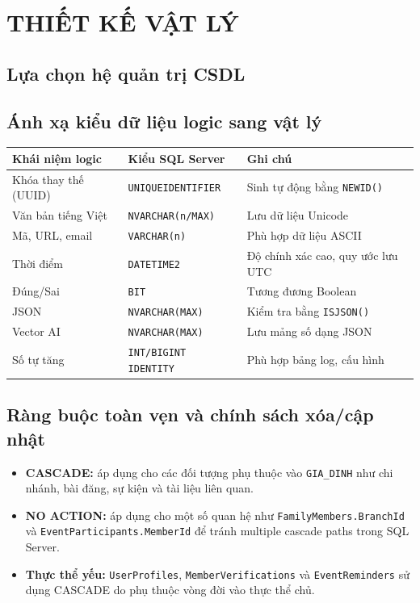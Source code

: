 \chapter{THIẾT KẾ VẬT LÝ}

\section{Lựa chọn hệ quản trị CSDL}

\section{Ánh xạ kiểu dữ liệu logic sang vật lý}

\begin{center}
\begin{tabularx}{\linewidth}{@{}l>{\raggedright\arraybackslash}l>{\raggedright\arraybackslash}X@{}}
\toprule
\textbf{Khái niệm logic} & \textbf{Kiểu SQL Server} & \textbf{Ghi chú} \\
\midrule
Khóa thay thế (UUID) & \texttt{UNIQUEIDENTIFIER} & Sinh tự động bằng \texttt{NEWID()} \\
Văn bản tiếng Việt & \texttt{NVARCHAR(n/MAX)} & Lưu dữ liệu Unicode \\
Mã, URL, email & \texttt{VARCHAR(n)} & Phù hợp dữ liệu ASCII \\
Thời điểm & \texttt{DATETIME2} & Độ chính xác cao, quy ước lưu UTC \\
Đúng/Sai & \texttt{BIT} & Tương đương Boolean \\
JSON & \texttt{NVARCHAR(MAX)} & Kiểm tra bằng \texttt{ISJSON()} \\
Vector AI & \texttt{NVARCHAR(MAX)} & Lưu mảng số dạng JSON \\
Số tự tăng & \texttt{INT/BIGINT IDENTITY} & Phù hợp bảng log, cấu hình \\
\bottomrule
\end{tabularx}
\end{center}

\section{Ràng buộc toàn vẹn và chính sách xóa/cập nhật}

\begin{itemize}
    \item \textbf{CASCADE:} áp dụng cho các đối tượng phụ thuộc vào \texttt{GIA\_DINH} như chi nhánh, bài đăng, sự kiện và tài liệu liên quan.
    \item \textbf{NO ACTION:} áp dụng cho một số quan hệ như \texttt{FamilyMembers.BranchId} và \texttt{EventParticipants.MemberId} để tránh multiple cascade paths trong SQL Server.
    \item \textbf{Thực thể yếu:} \texttt{UserProfiles}, \texttt{MemberVerifications} và \texttt{EventReminders} sử dụng CASCADE do phụ thuộc vòng đời vào thực thể chủ.
\end{itemize}

